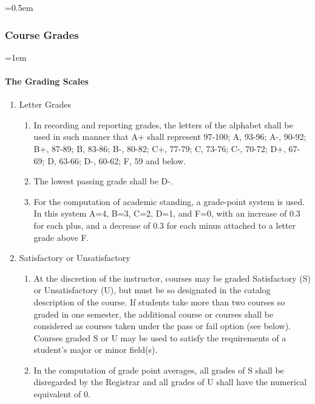 \documentclass{manual}
\let\oldsubsubsection\subsubsection
\renewcommand\subsubsection{\leftskip=0.5em\oldsubsubsection}
\let\oldparagraph\paragraph
\renewcommand\paragraph{\leftskip=1em\oldparagraph}
\newcommand{\itemLevelA}{\alph*.}
\newcommand{\itemLevelB}{\arabic*)}
\newcommand{\itemRefA}{\alph*}
\newcommand{\itemRefB}{\arabic*}
\begin{document}
		\subsubsection{Course Grades}\label{sub:CourseGrades}

			\paragraph{The Grading Scales}

				\begin{enumerate}[label=\itemLevelA,ref=\itemRefA]
				\item Letter Grades

					\begin{enumerate}[label=\itemLevelB,ref=\itemRefB]
					\item In recording and reporting grades, the letters of the alphabet shall be used in such manner that A+ shall represent 97-100; A, 93-96; A-, 90-92; B+, 87-89; B, 83-86; B-, 80-82; C+, 77-79; C, 73-76; C-, 70-72; D+, 67-69; D, 63-66; D-, 60-62; F, 59 and below. 
					\item The lowest passing grade shall be D-. 
					\item For the computation of academic standing, a grade-point system is used. In this system A=4, B=3, C=2, D=1, and F=0, with an increase of 0.3 for each plus, and a decrease of 0.3 for each minus attached to a letter grade above F. 
					\end{enumerate}
				
				\item Satisfactory or Unsatisfactory

					\begin{enumerate}[label=\itemLevelB,ref=\itemRefB]
					\item At the discretion of the instructor, courses may be graded Satisfactory (S) or Unsatisfactory (U), but must be so designated in the catalog description of the course. If students take more than two courses so graded in one semester, the additional course or courses shall be considered as courses taken under the pass or fail option (see below). Courses graded S or U may be used to satisfy the requirements of a student's major or minor field(s).
					\item In the computation of grade point averages, all grades of S shall be disregarded by the Registrar and all grades of U shall have the numerical equivalent of 0.
					\end{enumerate}
				

\end{enumerate}
\end{document}
